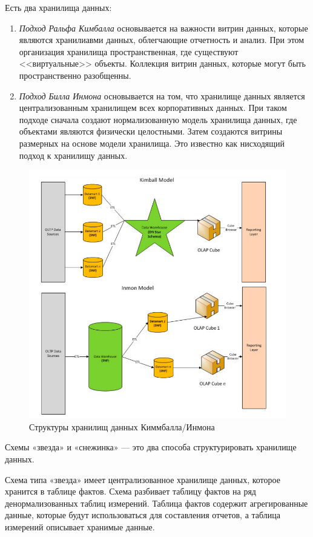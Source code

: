 Есть два хранилища данных:
\begin{enumerate}
	\item \textit{Подход Ральфа Кимбалла} основывается на важности витрин данных, которые являются хранилиавми данных, облегчающие отчетность и анализ. При этом организация хранилища пространственная, где существуют <<виртуальные>> объекты. Коллекция витрин данных, которые могут быть пространственно разобщенны.
	\item \textit{Подход Билла Инмона} основывается на том, что хранилище данных является централизованным хранилищем всех корпоративных данных. При таком подходе сначала создают нормализованную модель хранилища данных, где объектами являются физически целостными. Затем создаются витрины размерных на основе модели хранилища. Это известно как нисходящий подход к хранилищу данных.
\end{enumerate}

\begin{figure}[ht!]
	\centering
	\includegraphics[width=18cm, keepaspectratio]{assets/db-places.png}
	\caption{Структуры хранилищ данных Киммбалла/Инмона} 
\end{figure}
\FloatBarrier

Схемы «звезда» и «снежинка» — это два способа структурировать хранилище данных.

Схема типа «звезда» имеет централизованное хранилище данных, которое хранится в таблице фактов. Схема разбивает таблицу фактов на ряд денормализованных таблиц измерений. Таблица фактов содержит агрегированные данные, которые будут использоваться для составления отчетов, а таблица измерений описывает хранимые данные. 

